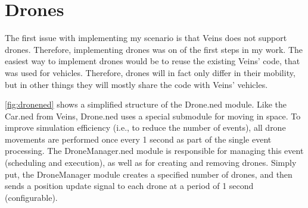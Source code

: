 \documentclass[]{nsm-thesis}
\begin{document}
\section{Drones}

The first issue with implementing my scenario is that Veins does not support drones. Therefore, implementing drones was on of the first steps in my work. The easiest way to implement drones would be to reuse the existing Veins' code, that was used for vehicles. Therefore, drones will in fact only differ in their mobility, but in other things they will mostly share the code with Veins' vehicles.

\cref{fig:dronened} shows a simplified structure of the Drone.ned module. Like the Car.ned from Veins, Drone.ned uses a special submodule for moving in space. To improve simulation efficiency (i.e., to reduce the number of events), all drone movements are performed once every 1 second as part of the single event processing. The DroneManager.ned module is responsible for managing this event (scheduling and execution), as well as for creating and removing drones. Simply put, the DroneManager module creates a specified number of drones, and then sends a position update signal to each drone at a period of 1 second (configurable). 
\end{document}
